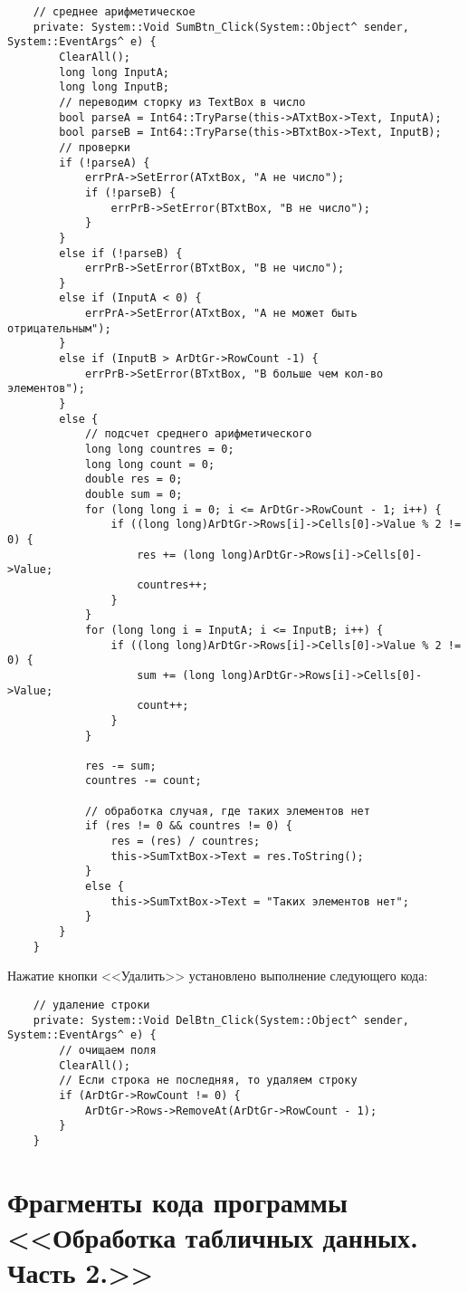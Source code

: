 \begin{verbatim}
	// среднее арифметическое
	private: System::Void SumBtn_Click(System::Object^ sender, System::EventArgs^ e) {
		ClearAll();
		long long InputA;
		long long InputB;
		// переводим сторку из TextBox в число
		bool parseA = Int64::TryParse(this->ATxtBox->Text, InputA);
		bool parseB = Int64::TryParse(this->BTxtBox->Text, InputB);
        // проверки
		if (!parseA) {
			errPrA->SetError(ATxtBox, "A не число");
			if (!parseB) {
				errPrB->SetError(BTxtBox, "B не число");
			}
		}
		else if (!parseB) {
			errPrB->SetError(BTxtBox, "B не число");
		}
		else if (InputA < 0) {
			errPrA->SetError(ATxtBox, "А не может быть отрицательным");
		}
		else if (InputB > ArDtGr->RowCount -1) {
			errPrB->SetError(BTxtBox, "B больше чем кол-во элементов");
		}
		else {
			// подсчет среднего арифметического
			long long countres = 0;
			long long count = 0;
			double res = 0;
			double sum = 0;
			for (long long i = 0; i <= ArDtGr->RowCount - 1; i++) {
				if ((long long)ArDtGr->Rows[i]->Cells[0]->Value % 2 != 0) {
					res += (long long)ArDtGr->Rows[i]->Cells[0]->Value;
					countres++;
				}
			}
			for (long long i = InputA; i <= InputB; i++) {
				if ((long long)ArDtGr->Rows[i]->Cells[0]->Value % 2 != 0) {
					sum += (long long)ArDtGr->Rows[i]->Cells[0]->Value;
					count++;
				}
			}

			res -= sum;
			countres -= count;

			// обработка случая, где таких элементов нет
			if (res != 0 && countres != 0) {
				res = (res) / countres;
				this->SumTxtBox->Text = res.ToString();
			}
			else {
				this->SumTxtBox->Text = "Таких элементов нет";
			}
		}
	}
\end{verbatim}

Нажатие кнопки <<Удалить>> установлено выполнение следующего кода:

\begin{verbatim}
	// удаление строки
	private: System::Void DelBtn_Click(System::Object^ sender, System::EventArgs^ e) {
        // очищаем поля
		ClearAll();
        // Если строка не последняя, то удаляем строку
		if (ArDtGr->RowCount != 0) {
			ArDtGr->Rows->RemoveAt(ArDtGr->RowCount - 1);
		}
	}
\end{verbatim}

\section{Фрагменты кода программы <<Обработка табличных данных. Часть 2.>>}\label{app:task5}

